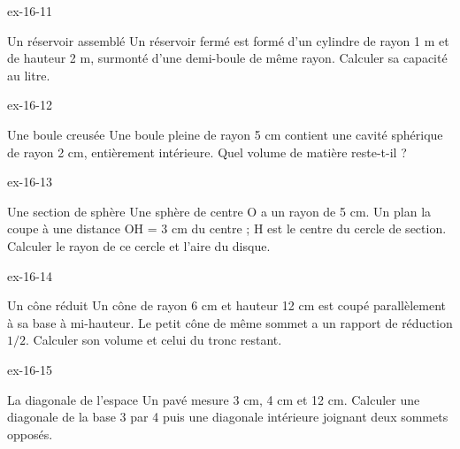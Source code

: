 \clearpage{}
\begin{blocLivre}{ex-16-11}\begin{exercice}[3]{Un réservoir assemblé}
Un réservoir fermé est formé d’un cylindre de rayon 1 m et de hauteur 2 m, surmonté d’une demi-boule de même rayon. Calculer sa capacité au litre.
\label{fig-ex-16-11}
\end{exercice}\end{blocLivre}
\begin{blocLivre}{ex-16-12}\begin{exercice}[3]{Une boule creusée}
Une boule pleine de rayon 5 cm contient une cavité sphérique de rayon 2 cm, entièrement intérieure. Quel volume de matière reste-t-il ?
\label{fig-ex-16-12}
\end{exercice}\end{blocLivre}
\begin{blocLivre}{ex-16-13}\begin{exercice}[3]{Une section de sphère}
Une sphère de centre O a un rayon de 5 cm. Un plan la coupe à une distance OH = 3 cm du centre ; H est le centre du cercle de section. Calculer le rayon de ce cercle et l’aire du disque.
\label{fig-ex-16-13}
\end{exercice}\end{blocLivre}
\begin{blocLivre}{ex-16-14}\begin{exercice}[3]{Un cône réduit}
Un cône de rayon 6 cm et hauteur 12 cm est coupé parallèlement à sa base à mi-hauteur. Le petit cône de même sommet a un rapport de réduction $1/2$. Calculer son volume et celui du tronc restant.
\label{fig-ex-16-14}
\end{exercice}\end{blocLivre}
\begin{blocLivre}{ex-16-15}\begin{exercice}[3]{La diagonale de l’espace}
Un pavé mesure 3 cm, 4 cm et 12 cm. Calculer une diagonale de la base 3 par 4 puis une diagonale intérieure joignant deux sommets opposés.
\label{fig-ex-16-15}
\end{exercice}\end{blocLivre}

\clearpage
